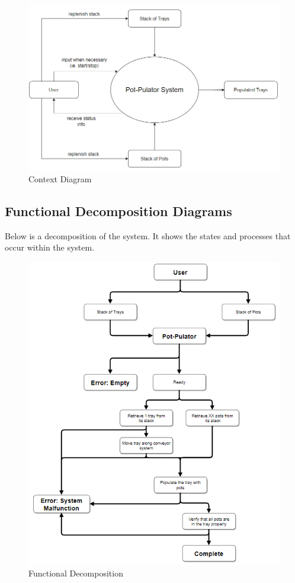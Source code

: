 \documentclass[12pt]{article}
\begin{document}
\begin{figure}[H]
  \includegraphics[width=\linewidth]{contextDiagram.png}
  \caption{Context Diagram}
  \label{fig:context1}
\end{figure}


\subsection{Functional Decomposition Diagrams}
Below is a decomposition of the system. It shows the states and processes that
occur within the system.

\begin{figure}[H]
  \includegraphics[width=\linewidth]{functionalDiagram.PNG}
  \caption{Functional Decomposition}
  \label{fig:functional1}
\end{figure}
\end{document}
